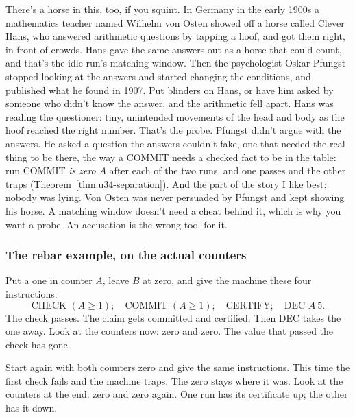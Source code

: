 \documentclass[11pt,twoside]{article}
\theoremstyle{thielethm}
\theoremstyle{thieledef}
\theoremstyle{thieledef}
\theoremstyle{thieledef}
\theoremstyle{thielethm}
\theoremstyle{thieleobs}
\theoremstyle{thielethm}
\begin{document}
There's a horse in this, too, if you squint. In Germany in the early 1900s a mathematics teacher
named Wilhelm von Osten showed off a horse called Clever Hans, who answered arithmetic questions
by tapping a hoof, and got them right, in front of crowds. Hans gave the same answers out as a horse that could
count, and that's the idle run's matching window. Then the psychologist Oskar Pfungst stopped looking
at the answers and started changing the conditions, and published what he found in 1907. Put
blinders on Hans, or have him asked by someone who didn't know the answer, and the arithmetic fell
apart. Hans was reading the questioner: tiny, unintended movements of the head and body as the
hoof reached the right number. That's the probe. Pfungst didn't argue with the answers. He asked a
question the answers couldn't fake, one that needed the real thing to be there, the way a COMMIT
needs a checked fact to be in the table: run COMMIT \emph{is zero} $A$ after each of the two runs,
and one passes and the other traps (Theorem~\ref{thm:u34-separation}). And the part of the story I
like best: nobody was lying. Von Osten was never persuaded by Pfungst and kept showing his horse.
A matching window doesn't need a cheat behind it, which is why you want a probe. An accusation is
the wrong tool for it.

\subsubsection*{The rebar example, on the actual counters}

Put a one in counter $A$, leave $B$ at zero, and give the machine these four instructions:
\[
\text{CHECK }(A\ge1);\quad\text{COMMIT }(A\ge1);\quad
\text{CERTIFY};\quad\text{DEC }A\ 5.
\]
The check passes. The claim gets committed and certified. Then DEC takes the one away.
Look at the counters now: zero and zero. The value that passed the check has gone.

Start again with both counters zero and give the same instructions. This time the first
check fails and the machine traps. The zero stays where it was. Look at the counters
at the end: zero and zero again. One run has its certificate up; the other has it down.
\end{document}
